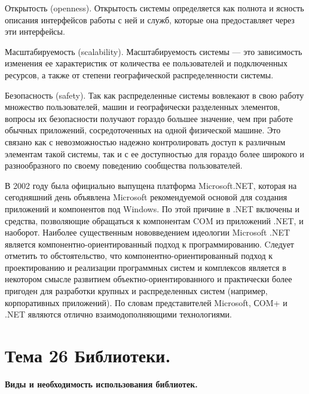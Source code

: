 \begin{opr}
  Открытость (openness). Открытость системы определяется как полнота и ясность описания интерфейсов работы с ней и служб, которые она предоставляет через эти интерфейсы. 
\end{opr}

\begin{opr}
  Масштабируемость (scalability). Масштабируемость системы — это зависимость изменения ее характеристик от количества ее пользователей и подключенных ресурсов, а также от степени географической распределенности системы. 
\end{opr}

\begin{opr}
  Безопасность (safety). Так как распределенные системы вовлекают в свою работу множество пользователей, машин и географически разделенных элементов, вопросы их безопасности получают гораздо большее значение, чем при работе обычных приложений, сосредоточенных на одной физической машине. Это связано как с невозможностью надежно контролировать доступ к различным элементам такой системы, так и с ее доступностью для гораздо более широкого и разнообразного по своему поведению сообщества пользователей.
\end{opr}

В 2002 году была официально выпущена платформа Microsoft.NET, которая на сегодняшний день объявлена Microsoft рекомендуемой основой для создания приложений и компонентов под Windows. По этой причине в .NET включены и средства, позволяющие обращаться к компонентам COM из приложений .NET, и наоборот. Наиболее существенным нововведением идеологии Microsoft .NET является компонентно-ориентированный подход к программированию. Cледует отметить то обстоятельство, что компонентно-ориентированный подход к проектированию и реализации программных систем и комплексов является в некотором смысле развитием объектно-ориентированного и практически более пригоден для разработки крупных и распределенных систем (например, корпоративных приложений). По словам представителей Microsoft, СOM+ и .NET являются отлично взаимодополняющими технологиями.

\newpage 
\chapter{Тема 26 Библиотеки.}

\begin{center}{\bfseries Виды и необходимость использования библиотек.}
\end{center}

